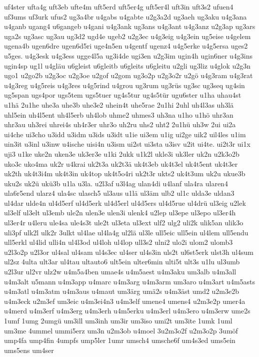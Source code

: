 {uf4ster
ufta4g
uft3eb
ufte4m
uft5erd
uft5er4g
uft5er4l
uft3in
uft3s2
ufuen4
uf3ums
uf3urk
ufus2
ug3a4br
u4gabs
u4gabte
u2g3a2d
ug3aeh
ug3aku
u4g3ana
u4ganb
ugang4
u6gangeb
u4gani
u4g3ank
ug3ans
u4g3ant
u4g3anz
u2g3ap
ug3ars
uga2s
ug3asc
ug3au
ug3d2
ugd4e
ugeb2
u2g3ec
u4g3eig
u4g3ein
ug5eise
u4gelem
ugena4b
ugen6dre
ugen6d5ri
uge4n5en
u4gentf
ugenz4
u4g5erke
u4g5ersa
uges2
u5ges.
u4g3esk
u4g3ess
ugge4l5a
ug3i4de
ugi3en
u2g3im
ugin4h
ugin6ner
u4g3ins
ugin4sp
ug1l
u4gläu
u6gleist
u6gleitb
u6gleits
u6gleitu
u2gli
ug3liz
u4glok
u2g3n
ugo1
u2go2b
u2g3oc
u2g3oe
u2gof
u2gom
ug3o2p
u2g3o2r
u2gö
u4g3ram
u4g3rat
u4g3reg
u4g5reis
u4g3res
u4g5rind
u4grou
ug3rum
ug3rüs
ug3sc
ug3seq
ug4sin
ug5span
ugs4por
ugs5tem
ugs5tuer
ug4s5tur
ug4s5tür
ugu6ster
u1ha
uhau4st
u1hä
2u1he
uhe3a
uhe3b
uhe3e2
uhein4t
uhe5rae
2u1hi
2uhl
uh4l3as
uh3lä
uhl5ein
uh4l5ent
uh4l5erb
uh4lob
uhme2
uhmes3
uh3na
u1ho
u1hö
uhr3an
uhr3au
uh3rei
uhrei4s
uh4r3er
uhr3o
uh2ru
uhs2
uht2
2u1hü
uh3w
2ui
ui2a
ui4che
ui3cho
u3idd
u3idm
u3ids
u3idt
u1ie
ui3em
u1ig
ui2ge
uik2
uil4les
u1im
uin3it
u3inl
u3inw
u4ische
uisi4n
u3ism
ui2st
ui3sta
u3isv
u2it
ui4te.
ui2t3r
ui1x
uji3
u1ke
uke2n
uken3e
uk3er3e
u1ki
2ukk
u1k2l
ukle3i
uk3ler
uk2n
u2k3o2b
uko3c
uko4ma
uk2r
u4krai
uk2t3a
uk2t3ä
uk4t3eb
uk4t3el
uk4t5ent
uk4t3er
uk2th
uk4t3i4m
uk4t3in
uk4top
uk4t5o4ri
uk2t3r
ukts2
uk4t3um
uk2u
ukue3b
uku2s
uk2ü
ukü3b
u1la
u3la.
u2l3af
u3l4ag
ulan4di
u4lanf
ula4ra
ularen4
ula6r5end
ularz4
ula4sc
ulasch5
ul3aus
u1lä
ul3äm
ulb2
ul1c
ulda3e
uldan3
ul4dar
ulde4n
ul4d5erf
ul4d5erk
ul4d5erl
ul4d5ers
ul4d5rue
ul4drü
ul3eig
u2lek
ul3elf
ul3elt
ul3emb
ule2n
ulen3e
ulen3i
ulenk4
u2lep
ul3epe
ul3epo
ul3er4h
ul3er4r
u4leru
ule4sa
ule4s3t
ule2t
ul3eta
ul3ext
ulf2
ulg2
uli2k
ulik5an
ulik3o
uli3pf
ulk2l
ulk2r
3ulkt
ul4lae
ul4la4g
ul2lä
ul3le
ull5eic
ull5ein
ul4lem
ull5endu
ull5erkl
ul4lid
ulli4n
ul4l3od
ul4loh
ul4lop
ull3s2
ulni2
ulo2i
ulom2
ulomb3
u2l3o2p
u2l3or
ul4sal
ul4sam
ul4s3ec
ul4ser
ul4s3in
uls2t
ul6st5erk
ulst3h
ul4sum
ul2sz
4ulta
ult3ar
ul4tau
ultauto6
ult5ein
ulter6min
ulti5t
ult3s
u1lu
ul3umb
u2l3ur
ul2vr
ulz2w
u4m5a4ben
umae4s
u4m5aest
u4m3aku
um3alb
u4m3all
u4m3alt
u5mann
u4m3app
u4marc
u4m3arg
u4m3arm
um3aro
u4m3art
u4m5asts
u4m3atl
u4m3atm
u4m3aus
u4maut
um3ärg
umä2s
u4m3äst
umd2
u2m3e2b
u4m3eck
u2m3ef
um3eic
u4m3ei4n3
u4m3elf
umene4
umens4
u2m3e2p
umer4a
u4merd
u4m3erf
u4m3erg
u4m3erh
u4m5erku
u4m3erl
u4m3ero
u4m3erw
ume2s
1umf
1umg
2umgü
um3ill
um3inh
um3ir
um3iso
umi2t
um3ite
1umk
1uml
um3me
4ummel
ummi5erz
um3n
u2m3ob
u4moel
3u2m3o2f
u2m3o2p
3umöf
ump4fa
ump4fin
4umpfs
ump5ler
1umr
umsch4
umsche6f
um4s3ed
ums5ein
ums5ens
um4ser
}
